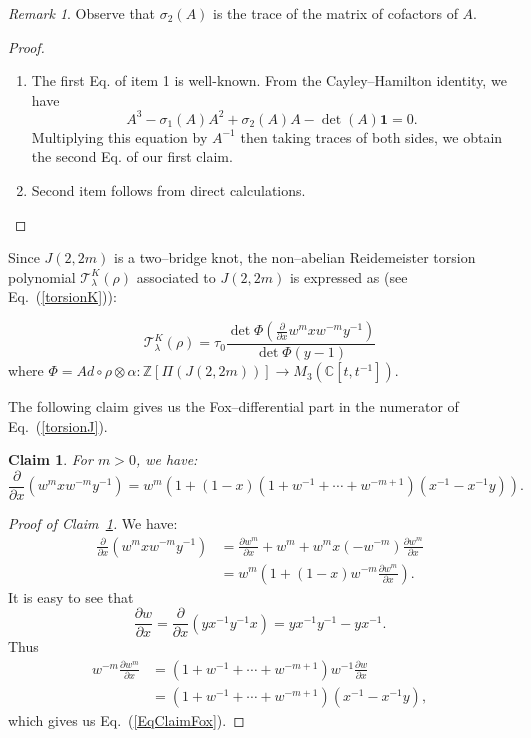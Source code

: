 \documentclass[a4paper]{amsart}
\theoremstyle{plain}
\newtheorem{claim}[theorem]{Claim}
\theoremstyle{definition}
\theoremstyle{remark}
\newtheorem{remark}{Remark}%
\newcommand{\Z}{{\mathbb Z}}
\newcommand{\C}{{\mathbb C}}
\newcommand{\I}{\mathbf{1}}
\newcommand{\T}{\mathcal{T}}
\begin{document}
{\begin{remark}
Observe that $\sigma_2(A)$ is the trace of the matrix of cofactors of $A$.
\end{remark}}

\begin{proof}
\phantom{}\hfill
\begin{enumerate}
  \item The first Eq. of item 1 is well-known. From the Cayley--Hamilton identity, we have
\[
A^3 - \sigma_1(A) A^2 + \sigma_2(A) A - \det(A) \I= 0.
\]
Multiplying this equation by $A^{-1}$ then taking traces of both sides, we obtain the second Eq. of our first claim.
  \item Second item follows from direct calculations.
\end{enumerate}
\end{proof}


Since $J(2, 2m)$ is a two--bridge knot,
the non--abelian Reidemeister torsion polynomial
$\T^K_\lambda(\rho)$ associated to $J(2, 2m)$
is expressed as (see Eq.~(\ref{torsionK})):

\begin{equation}\label{torsionJ}
\T^K_\lambda(\rho) = \tau_0
\frac{\det \Phi(\frac{\partial}{\partial x}w^m x w^{-m} y^{-1} )  }
{\det \Phi(y-1)}
\end{equation}
where $\Phi=Ad\circ \rho \otimes \alpha: \Z [\Pi(J(2, 2m))] \to M_3(\C[t, t^{-1}])$.

The following claim gives us the Fox--differential part in the numerator of Eq.~(\ref{torsionJ}).

\begin{claim}\label{ClaimFox}
For $m > 0$, we have:
\begin{equation}\label{EqClaimFox}
\frac{\partial}{\partial x} \left( w^m x w^{-m} y^{-1} \right)  = w^m\left(1 + (1-x)(1 + w^{-1} + \cdots + w^{-m+1})(x^{-1}-x^{-1}y) \right).
\end{equation}
\end{claim}

\begin{proof}[Proof of Claim~\ref{ClaimFox}]
We have:
\begin{align*}
\frac{\partial}{\partial x} \left( w^m x w^{-m} y^{-1} \right) 
&=
\frac{\partial w^m}{\partial x}
+ w^m
+ w^m x (-w^{-m})\frac{\partial w^m}{\partial x} \nonumber \\
&=
w^m
\left(1+(1-x)w^{-m}\frac{\partial w^m}{\partial x}\right). 
\end{align*}
It is easy to see that
\[
\frac{\partial w}{\partial x} = \frac{\partial}{\partial x}\left(yx^{-1}y^{-1}x\right) = yx^{-1}y^{-1} - yx^{-1}.
\] 
Thus
\begin{align*}
w^{-m}\frac{\partial w^m}{\partial x}
&=
(1+ w^{-1} +\cdots + w^{-m+1})w^{-1}\frac{\partial w}{\partial x}
\nonumber\\
&=
(1 + w^{-1} + \cdots + w^{-m+1})(x^{-1}-x^{-1}y),
\end{align*}
which gives us Eq.~(\ref{EqClaimFox}).
\end{proof}
\end{document}
